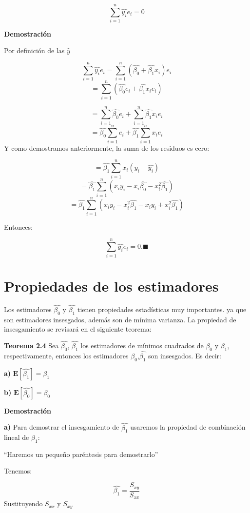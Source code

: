 \documentclass[a4paper,oneside,openany]{book}
\begin{document}
\[\sum_{i=1}^{n}\hat{y_{i}}e_{i}=0\]

\textbf{Demostración}

Por definición de las \(\hat{y}\)

\[\sum_{i=1}^{n}\hat{y_{i}}e_{i}=\sum_{i=1}^{n}(\hat{\beta_{0}}+\hat{\beta_{1}}x_{i})e_{i}\]
\[=\sum_{i=1}^{n}\left(\hat{\beta_{0}}e_{i}+\hat{\beta_{1}}x_{i}e_{i}\right)\]

\[=\sum_{i=1}^{n}\hat{\beta_{0}}e_{i}+\sum_{i=1}^{n}\hat{\beta_{1}}x_{i}e_{i}\]
\[=\hat{\beta_{0}}\sum_{i=1}^{n}e_{i}+\hat{\beta_{1}}\sum_{i=1}^{n}x_{i}e_{i}\]
Y como demostramos anteriormente, la suma de los residuos es cero:

\[=\hat{\beta_{1}}\sum_{i=1}^{n}x_{i}(y_{i}-\hat{y_{i}})\]
\[=\hat{\beta_{1}}\sum_{i=1}^{n}\left(x_{i}y_{i}-x_{i}\hat{\beta_{0}}-x_{i}^{2}\hat{\beta_{1}}\right)\]
\[=\hat{\beta_{1}}\sum_{i=1}^{n}\left(x_{i}y_{i}-x_{i}^2\hat{\beta_{1}}-x_{i}y_{i}+x_{i}^{2}\hat{\beta_{1}}\right)\]

Entonces:

\[\sum_{i=1}^{n}\hat{y_{i}}e_{i}=0. \blacksquare\]

\section{Propiedades de los
estimadores}\label{propiedades-de-los-estimadores}

Los estimadores \(\hat{\beta_{0}}\) y \(\hat{\beta_{1}}\) tienen
propiedades estadísticas muy importantes. ya que son estimadores
insesgados, además son de mínima varianza. La propiedad de insesgamiento
se revisará en el siguiente teorema:

\textbf{Teorema 2.4} Sea \(\hat{\beta_{0}}\), \(\hat{\beta_{1}}\) los
estimadores de mínimos cuadrados de \(\beta_{0}\) y \(\beta_{1}\),
respectivamente, entonces los estimadores
\(\hat{\beta_{0}}\),\(\hat{\beta_{1}}\) son insesgados. Es decir:

\textbf{a)} \(\mathbf{E}\left[\hat{\beta_{1}}\right]=\beta_{1}\)

\textbf{b)} \(\mathbf{E}\left[\hat{\beta_{0}}\right]=\beta_{0}\)

\textbf{Demostración}

\textbf{a)} Para demostrar el insesgamiento de \(\hat{\beta_{1}}\)
usaremos la propiedad de combinación lineal de \(\beta_{1}:\)

``Haremos un pequeño paréntesis para demostrarlo''

Tenemos:

\[\hat{\beta_{1}}=\frac{S_{xy}}{S_{xx}}\] Sustituyendo \(S_{xx}\) y
\(S_{xy}\)
\end{document}
